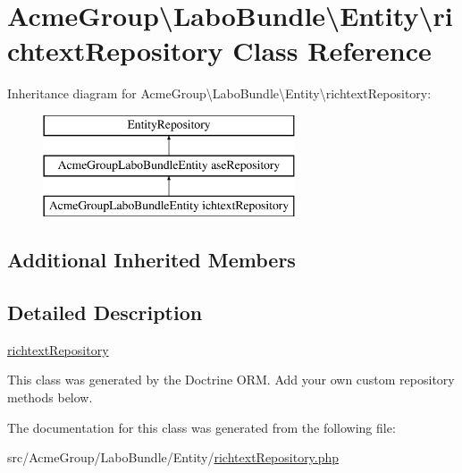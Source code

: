 \hypertarget{class_acme_group_1_1_labo_bundle_1_1_entity_1_1richtext_repository}{\section{Acme\+Group\textbackslash{}Labo\+Bundle\textbackslash{}Entity\textbackslash{}richtext\+Repository Class Reference}
\label{class_acme_group_1_1_labo_bundle_1_1_entity_1_1richtext_repository}
}
Inheritance diagram for Acme\+Group\textbackslash{}Labo\+Bundle\textbackslash{}Entity\textbackslash{}richtext\+Repository\+:\begin{figure}[H]
\begin{center}
\leavevmode
\includegraphics[height=3.000000cm]{class_acme_group_1_1_labo_bundle_1_1_entity_1_1richtext_repository}
\end{center}
\end{figure}
\subsection*{Additional Inherited Members}


\subsection{Detailed Description}
\hyperlink{class_acme_group_1_1_labo_bundle_1_1_entity_1_1richtext_repository}{richtext\+Repository}

This class was generated by the Doctrine O\+R\+M. Add your own custom repository methods below. 

The documentation for this class was generated from the following file\+:\begin{DoxyCompactItemize}
\item 
src/\+Acme\+Group/\+Labo\+Bundle/\+Entity/\hyperlink{richtext_repository_8php}{richtext\+Repository.\+php}\end{DoxyCompactItemize}
